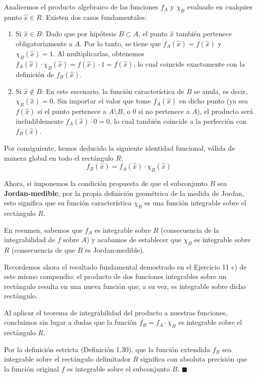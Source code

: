 \documentclass[11pt,letterpaper]{article}
\begin{document}
Analicemos el producto algebraico de las funciones $f_A$ y $\chi_B$ evaluado en cualquier punto $\hat{x} \in R$. Existen dos casos fundamentales:
\begin{enumerate}
    \item Si $\hat{x} \in B$: Dado que por hipótesis $B \subset A$, el punto $\hat{x}$ también pertenece obligatoriamente a $A$. Por lo tanto, se tiene que $f_A(\hat{x}) = f(\hat{x})$ y $\chi_B(\hat{x}) = 1$. Al multiplicarlas, obtenemos $f_A(\hat{x}) \cdot \chi_B(\hat{x}) = f(\hat{x}) \cdot 1 = f(\hat{x})$, lo cual coincide exactamente con la definición de $f_B(\hat{x})$.
    \item Si $\hat{x} \notin B$: En este escenario, la función característica de $B$ se anula, es decir, $\chi_B(\hat{x}) = 0$. Sin importar el valor que tome $f_A(\hat{x})$ en dicho punto (ya sea $f(\hat{x})$ si el punto pertenece a $A \setminus B$, o $0$ si no pertenece a $A$), el producto será ineludiblemente $f_A(\hat{x}) \cdot 0 = 0$, lo cual también coincide a la perfección con $f_B(\hat{x})$.
\end{enumerate}

Por consiguiente, hemos deducido la siguiente identidad funcional, válida de manera global en todo el rectángulo $R$:
\begin{equation*}
f_B(\hat{x}) = f_A(\hat{x}) \cdot \chi_B(\hat{x})
\end{equation*}

Ahora, si imponemos la condición propuesta de que el subconjunto $B$ sea \textbf{Jordan-medible}, por la propia definición geométrica de la medida de Jordan, esto significa que su función característica $\chi_B$ es una función integrable sobre el rectángulo $R$.

En resumen, sabemos que $f_A$ es integrable sobre $R$ (consecuencia de la integrabilidad de $f$ sobre $A$) y acabamos de establecer que $\chi_B$ es integrable sobre $R$ (consecuencia de que $B$ es Jordan-medible). 

Recordemos ahora el resultado fundamental demostrado en el Ejercicio 11 c) de este mismo compendio: el producto de dos funciones integrables sobre un rectángulo resulta en una nueva función que, a su vez, es integrable sobre dicho rectángulo.

Al aplicar el teorema de integrabilidad del producto a nuestras funciones, concluimos sin lugar a dudas que la función $f_B = f_A \cdot \chi_B$ es integrable sobre el rectángulo $R$. 

Por la definición estricta (Definición 1.30), que la función extendida $f_B$ sea integrable sobre el rectángulo delimitador $R$ significa con absoluta precisión que la función original $f$ es integrable sobre el subconjunto $B$. \hfill $\blacksquare$
\end{document}
